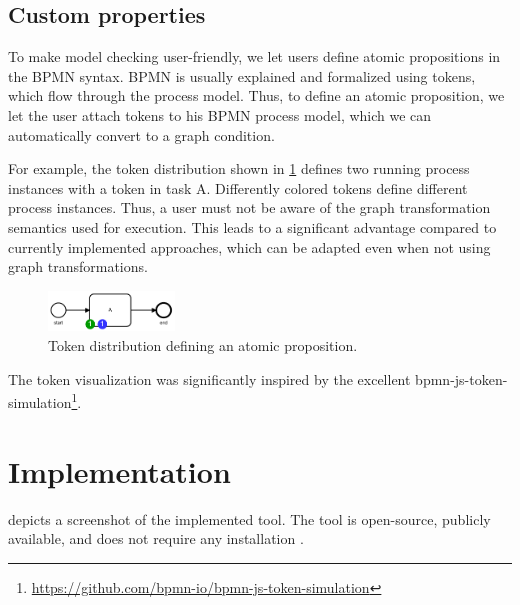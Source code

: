 \documentclass[adraft, copyright, creativecommons]{eptcs} %
\begin{document}
\subsection{Custom properties}

To make model checking user-friendly, we let users define atomic propositions in the BPMN syntax.
BPMN is usually explained and formalized using tokens, which flow through the process model.
Thus, to define an atomic proposition, we let the user attach tokens to his BPMN process model, which we can automatically convert to a graph condition.

For example, the token distribution shown in \cref{fig:atomicProposition} defines two running process instances with a token in task A.
Differently colored tokens define different process instances.
Thus, a user must not be aware of the graph transformation semantics used for execution.
This leads to a significant advantage compared to currently implemented approaches, which can be adapted even when not using graph transformations.

\begin{figure}[h]
    \centering
    \includegraphics[width=0.3\textwidth]{images/bpmn_semantics-atomicProp.pdf}
    \caption{Token distribution defining an atomic proposition.}
    \label{fig:atomicProposition}
\end{figure}

The token visualization was significantly inspired by the excellent bpmn-js-token-simulation\footnote{\url{https://github.com/bpmn-io/bpmn-js-token-simulation}}.
\section{Implementation} \label{sec:impl}
 depicts a screenshot of the implemented tool.
The tool is open-source, publicly available, and does not require any installation \cite{timkrauterArtifactsTERMGRAPH2022}.
\end{document}
